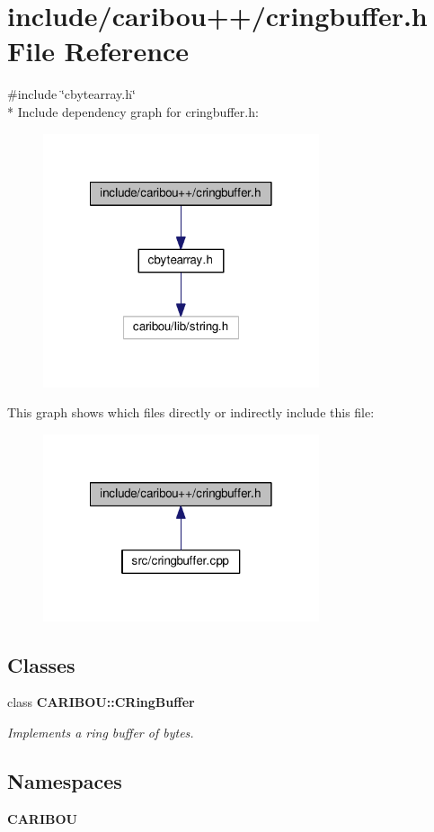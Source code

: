 \section{include/caribou++/cringbuffer.h File Reference}
\label{cringbuffer_8h}
{\ttfamily \#include \char`\"{}cbytearray.\-h\char`\"{}}\\*
Include dependency graph for cringbuffer.\-h\-:\nopagebreak
\begin{figure}[H]
\begin{center}
\leavevmode
\includegraphics[width=230pt]{cringbuffer_8h__incl}
\end{center}
\end{figure}
This graph shows which files directly or indirectly include this file\-:\nopagebreak
\begin{figure}[H]
\begin{center}
\leavevmode
\includegraphics[width=230pt]{cringbuffer_8h__dep__incl}
\end{center}
\end{figure}
\subsection*{Classes}
\begin{DoxyCompactItemize}
\item 
class {\bf C\-A\-R\-I\-B\-O\-U\-::\-C\-Ring\-Buffer}
\begin{DoxyCompactList}\small\item\em Implements a ring buffer of bytes. \end{DoxyCompactList}\end{DoxyCompactItemize}
\subsection*{Namespaces}
\begin{DoxyCompactItemize}
\item 
{\bf C\-A\-R\-I\-B\-O\-U}
\end{DoxyCompactItemize}
